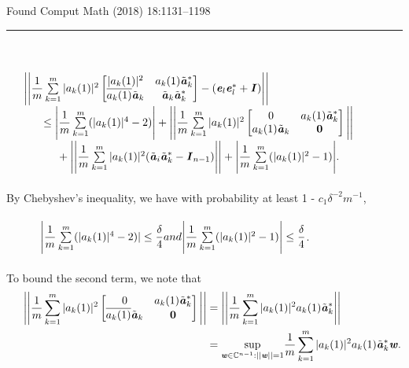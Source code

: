 \documentclass[20]{article}
\begin{document}
	 \hfill Found Comput Math (2018) 18:1131--1198\\
	\rule{\textwidth}{0.4pt}\\
	\indent 
	\large
	\\
	$\indent\Bigg|\Bigg|
	\dfrac{1}{m}\sum\limits_{k=1}^{m}|a_k(1)|^2
	\begin{bmatrix}
		|a_k(1)|^2 & a_k(1)\tilde{\textbf{\textit{a}}}_k^*\\
		\overline{a_k(1)}\tilde{\textbf{\textit{a}}}_k & \tilde{\textbf{\textit{a}}}_k\tilde{\textbf{\textit{a}}}_k^*
	\end{bmatrix} - (\textbf{\textit{e}}_l\textbf{\textit{e}}_l^* + \textbf{\textit{I}})
	\Bigg|\Bigg|$\\
	$\indent\indent\leq\Bigg|
	\dfrac{1}{m}\sum\limits_{k=1}^{m}(|a_k(1)|^4-2)
	\Bigg|+\Bigg|\Bigg|
	\dfrac{1}{m}\sum\limits_{k=1}^{m}|a_k(1)|^2
	\begin{bmatrix}
		0 & a_k(1)\tilde{\textbf{\textit{a}}}_k^*\\
		a_k(1)\tilde{\textbf{\textit{a}}}_k & \textbf{0}
	\end{bmatrix}\Bigg|\Bigg|$\\
	$\indent\indent\indent
	+\Bigg|\Bigg|
	\dfrac{1}{m}\sum\limits_{k=1}^{m}|a_k(1)|^2
	(\tilde{\textbf{\textit{a}}}_i\tilde{\textbf{\textit{a}}}_k^* - \textbf{\textit{I}}_{n-1})
	\Bigg|\Bigg|+\Bigg|
	\dfrac{1}{m}\sum\limits_{k=1}^{m}(|a_k(1)|^2-1)
	\Bigg|.$\\\\
	By Chebyshev's inequality, we have with probability at least 1 - $c_1\delta^{-2}m^{-1}$, \\\\
	$\indent\indent\Bigg|
	\dfrac{1}{m}\sum\limits_{k=1}^{m}(|a_k(1)|^4-2)| 
	\leq \dfrac{\delta}{4} 
	and 
	\Bigg|
	\dfrac{1}{m}\sum\limits_{k=1}^{m}(|a_k(1)|^2-1)
	\Bigg| 
	\leq \dfrac{\delta}{4}$.\\\\
	To bound the second term, we note that\\
	\begin{align*}
		\indent\Bigg|\Bigg|
		\dfrac{1}{m}\sum\limits_{k=1}^{m}|a_k(1)|^2
		\begin{bmatrix}
			0 & a_k(1)\tilde{\textbf{\textit{a}}}_k^*\\
			\overline{a_k(1)}\tilde{\textbf{\textit{a}}}_k & \textbf{0}
		\end{bmatrix}
		\Bigg|\Bigg| &= \Bigg|\Bigg|
		\dfrac{1}{m}\sum\limits_{k=1}^{m}|a_k(1)|^2a_k(1)\tilde{\textbf{\textit{a}}}_k^*
		\Bigg|\Bigg|\\
		&= \underset{\textbf{\textit{w}}\in\mathbb{C}^{n-1}:||\textbf{\textit{w}}||=1}{\textnormal{sup}} \dfrac{1}{m}\sum\limits_{k=1}^{m}|a_k(1)|^2a_k(1)\tilde{\textbf{\textit{a}}}_k^*\textbf{\textit{w}}.
	\end{align*}\\
\end{document}
